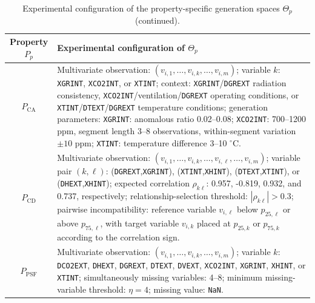 \documentclass[preprint,12pt]{elsarticle}
\begin{document}
\begin{table}[t]
\ContinuedFloat
\caption{Experimental configuration of the property-specific generation
spaces \(\Theta_p\) (continued).}
\label{tab:pbt_generation_config}
\centering

{\scriptsize
\setlength{\tabcolsep}{3pt}
\begin{tabular}{|c|p{10.7cm}|}
\hline
\textbf{Property \(P_p\)} &
\textbf{Experimental configuration of \(\Theta_p\)} \\
\hline
\hline

\(P_{\mathrm{CA}}\) &
Multivariate observation:
\((v_{i,1},\ldots,v_{i,k},\ldots,v_{i,m})\);
variable \(k\):
\texttt{XGRINT}, \texttt{XCO2INT}, or \texttt{XTINT};
context:
\texttt{XGRINT}/\texttt{DGREXT} radiation consistency,
\texttt{XCO2INT}/ventilation/\texttt{DGREXT} operating conditions,
or \texttt{XTINT}/\texttt{DTEXT}/\texttt{DGREXT} temperature conditions;
generation parameters:
\texttt{XGRINT}: anomalous ratio 0.02--0.08;
\texttt{XCO2INT}: 700--1200 ppm, segment length 3--8 observations,
within-segment variation \(\pm 10\) ppm;
\texttt{XTINT}: temperature difference 3--10 \(^{\circ}\)C. \\
\hline

\(P_{\mathrm{CD}}\) &
Multivariate observation:
\((v_{i,1},\ldots,v_{i,k},\ldots,v_{i,\ell},\ldots,v_{i,m})\);
variable pair \((k,\ell)\):
(\texttt{DGREXT},\texttt{XGRINT}),
(\texttt{XTINT},\texttt{XHINT}),
(\texttt{DTEXT},\texttt{XTINT}), or
(\texttt{DHEXT},\texttt{XHINT});
expected correlation \(\rho_{k\ell}\):
0.957, -0.819, 0.932, and 0.737, respectively;
relationship-selection threshold:
\(|\rho_{k\ell}|>0.3\);
pairwise incompatibility:
reference variable \(v_{i,\ell}\) below \(p_{25,\ell}\) or above
\(p_{75,\ell}\), with target variable \(v_{i,k}\) placed at
\(p_{25,k}\) or \(p_{75,k}\) according to the correlation sign. \\
\hline

\(P_{\mathrm{PSF}}\) &
Multivariate observation:
\((v_{i,1},\ldots,v_{i,k},\ldots,v_{i,m})\);
variable \(k\): \texttt{DCO2EXT}, \texttt{DHEXT}, \texttt{DGREXT},
\texttt{DTEXT}, \texttt{DVEXT}, \texttt{XCO2INT}, \texttt{XGRINT},
\texttt{XHINT}, or \texttt{XTINT};
simultaneously missing variables: 4--8;
minimum missing-variable threshold: \(\eta=4\);
missing value: \texttt{NaN}. \\
\hline

\end{tabular}

}
\end{table}
\end{document}
